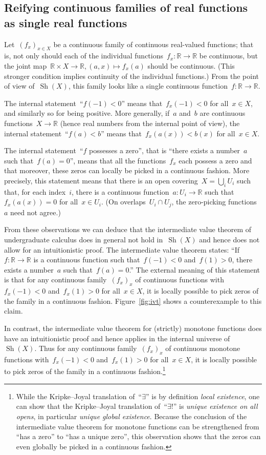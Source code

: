 \documentclass[graybox]{svmult}
\newcommand{\RR}{\mathbb{R}}
\DeclareMathOperator{\Sh}{Sh}
\renewcommand{\_}{\mathpunct{.}\,}
\newcommand{\?}{\,{:}\,}
\begin{document}
\subsection{Reifying continuous families of real functions as single real functions}
Let~$(f_x)_{x \in X}$ be a continuous family of
continuous real-valued functions; that is, not only should each of the individual
functions~$f_x : \RR \to \RR$ be continuous, but the joint map~$\RR
\times X \to \RR, (a,x) \mapsto f_x(a)$ should be continuous. (This stronger
condition implies continuity of the individual functions.)
From the point of view of~$\Sh(X)$, this family looks like a single continuous
function~$f : \RR \to \RR$.

The internal statement~``$f(-1) < 0$'' means that~$f_x(-1) < 0$ for all~$x \in
X$, and similarly so for being positive. More generally, if~$a$ and~$b$ are
continuous functions~$X \to \RR$ (hence real numbers from the internal point of
view), the internal statement~``$f(a) < b$'' means that~$f_x(a(x)) < b(x)$ for
all~$x \in X$.

The internal statement~``$f$ possesses a zero'', that is ``there exists a
number~$a$ such that~$f(a) = 0$'', means that all the functions~$f_x$ each
possess a zero and that moreover, these zeros can locally be picked in a
continuous fashion. More precisely, this statement means that there is an open
covering~$X = \bigcup_i U_i$ such that, for each index~$i$, there is a continuous
function~$a : U_i \to \RR$ such that~$f_x(a(x)) = 0$ for all~$x \in U_i$. (On
overlaps~$U_i \cap U_j$, the zero-picking functions~$a$ need not agree.)

\begin{example}
From these observations we can deduce that the intermediate value theorem of
undergraduate calculus does in general not hold in~$\Sh(X)$ and hence does not allow
for an intuitionistic proof. The intermediate value theorem states: ``If~$f : \RR \to \RR$
is a continuous function such that~$f(-1) < 0$ and~$f(1) > 0$, there exists a
number~$a$ such that~$f(a) = 0$.'' The external meaning of this statement is
that for any continuous family~$(f_x)_x$ of continuous functions with~$f_x(-1) <
0$ and~$f_x(1) > 0$ for all~$x \in X$, it is locally possible to pick zeros of
the family in a continuous fashion. Figure~\ref{fig:ivt} shows a counterexample
to this claim.

In contrast, the intermediate value theorem for (strictly) monotone functions does have an
intuitionistic proof and hence applies in the internal universe of~$\Sh(X)$.
Thus for any continuous family~$(f_x)_x$ of continuous monotone functions
with~$f_x(-1) < 0$ and~$f_x(1) > 0$ for all~$x \in X$, it is locally possible
to pick zeros of the family in a continuous fashion.\footnote{While the
Kripke--Joyal translation of~``$\exists$'' is by definition \emph{local
existence}, one can show that the Kripke--Joyal translation of~``$\exists!$''
is \emph{unique existence on all opens}, in particular \emph{unique global
existence}. Because the conclusion of the intermediate value theorem for
monotone functions can be strengthened from ``has a zero'' to ``has a unique
zero'', this observation shows that the zeros can even globally be picked in a
continuous fashion.}
\end{example}
\end{document}
